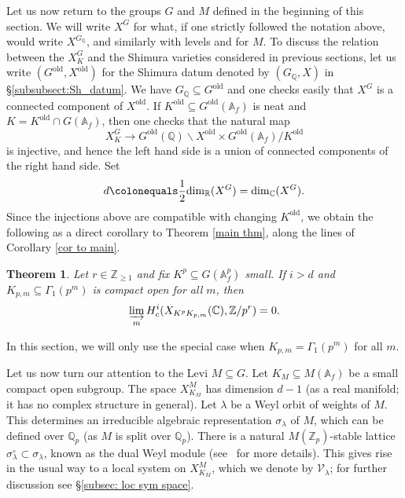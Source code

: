 \documentclass{amsart}
\newtheorem{thm}[subsubsection]{Theorem}
\theoremstyle{remark}
\numberwithin{equation}{subsection}
\newcommand{\A}{\AA}
\def\C{\CC}
\newcommand{\Q}{\QQ}
\newcommand{\R}{\RR}
\newcommand{\Z}{\ZZ}
\renewcommand{\AA}{{\mathbb A}}
\newcommand{\CC}{{\mathbb C}}
\newcommand{\QQ}{{\mathbb Q}}
\newcommand{\RR}{{\mathbb R}}
\newcommand{\ZZ}{{\mathbb Z}}
\newcommand{\cV}{{\mathcal V}}
\newcommand{\sub}{\subseteq}
\newcommand{\defeq}{\colonequals}
\renewcommand{\(}{\left(}
\renewcommand{\)}{\right)}
\begin{document}
Let us now return to the groups $G$ and $M$ defined in the beginning of this section. We will write $X^G$ for what, if one strictly followed the notation above, would write $X^{G_\Q}$, and similarly with levels and for $M$. To discuss the relation between the $X_K^G$ and the Shimura varieties considered in previous sections, let us write $(G^{\mathrm{old}},X^{\mathrm{old}})$ for the Shimura datum denoted by $(G_\Q,X)$ in \S \ref{subsubsect:Sh_datum}. We have $G_\Q \sub G^{\mathrm{old}}$ and one checks easily that $X^G$ is a connected component of $X^{\mathrm{old}}$. If $K^{\mathrm{old}} \sub G^{\mathrm{old}}(\A_f)$ is neat and $K = K^{\mathrm{old}} \cap G(\A_f)$, then one checks that the natural map
\[
X_K^G \to G^{\mathrm{old}}(\Q) \backslash X^{\mathrm{old}} \times G^{\mathrm{old}}(\A_f)/K^{\mathrm{old}}
\]
is injective, and hence the left hand side is a union of connected components of the right hand side. Set 
\[
d\defeq\frac{1}{2}\mathrm{dim}_{\R}(X^G) = \dim_{\C}(X^G).
\]
Since the injections above are compatible with changing $K^\mathrm{old}$, we obtain the following as a direct corollary to Theorem \ref{main thm}, along the lines of Corollary \ref{cor to main}.

\begin{thm}\label{main thm non-similitude} Let $r\in \Z_{\geq 1}$ and fix $K^p \sub G(\A_f^p)$ small. If $i>d$ and $K_{p,m} \sub \Gamma_1(p^m)$ is compact open for all $m$, then 
\[
 \varinjlim_{m} H^{i}_{c}(X_{K^p K_{p,m}}(\C),\Z/p^r)=0.
 \]
\end{thm}

\noindent In this section, we will only use the special case when  $K_{p,m}= \Gamma_1(p^m)$ for all $m$.

\medskip

Let us now turn our attention to the Levi $M\sub G$. Let $K_M\subseteq M(\A_f)$ be a small compact open subgroup. The space $X^M_{K_M}$ has dimension $d-1$ (as a real manifold; it has no complex structure in general). Let $\lambda$ be a Weyl orbit of weights of $M$. This determines an irreducible algebraic representation $\sigma_{\lambda}$ of $M$, which can
be defined over $\Q_p$ (as $M$ is split over $\Q_p$). There is a natural $M(\Z_p)$-stable 
lattice $\sigma^\circ_{\lambda}\subset \sigma_{\lambda}$, known as the dual Weyl module (see~\cite{jantzen} for more details). This gives rise in 
the usual way to a local system on $X^M_{K_M}$, which we denote by $\cV_{\lambda}$; for further discussion see \S \ref{subsec: loc sym space}. 

\medskip
\end{document}
